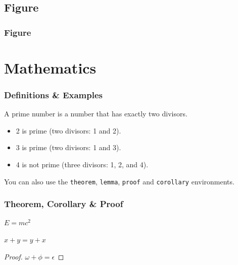 \documentclass[
11pt, %
]{beamer}
\begin{document}
	
	\subsection{Figure}
	
	\begin{frame}
		\frametitle{Figure}
		

	\end{frame}
	
	
	\section{Mathematics}
	
	\begin{frame}
		\frametitle{Definitions \& Examples}
		
		\begin{definition}
			A \alert{prime number} is a number that has exactly two divisors.
		\end{definition}
		
		\smallskip %
		
		\begin{example}
			\begin{itemize}
				\item 2 is prime (two divisors: 1 and 2).
				\item 3 is prime (two divisors: 1 and 3).
				\item 4 is not prime (\alert{three} divisors: 1, 2, and 4).
			\end{itemize}
		\end{example}
		
		\smallskip %
		
		You can also use the \texttt{theorem}, \texttt{lemma}, \texttt{proof} and \texttt{corollary} environments.
	\end{frame}
	
	
	\begin{frame}
		\frametitle{Theorem, Corollary \& Proof}
		
		\begin{theorem}
			$E = mc^2$
		\end{theorem}
		
		\begin{corollary}
			$x + y = y + x$
		\end{corollary}
		
		\begin{proof}
			$\omega + \phi = \epsilon$
		\end{proof}
	\end{frame}
	
\end{document}
